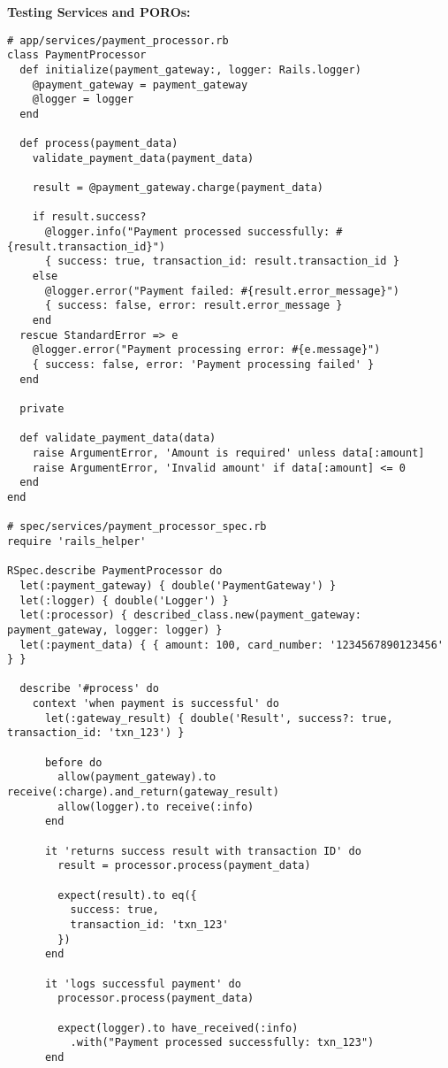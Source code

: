 \documentclass[12pt,a4paper]{article}
\begin{document}
\textbf{Testing Services and POROs:}
\begin{lstlisting}
# app/services/payment_processor.rb
class PaymentProcessor
  def initialize(payment_gateway:, logger: Rails.logger)
    @payment_gateway = payment_gateway
    @logger = logger
  end

  def process(payment_data)
    validate_payment_data(payment_data)
    
    result = @payment_gateway.charge(payment_data)
    
    if result.success?
      @logger.info("Payment processed successfully: #{result.transaction_id}")
      { success: true, transaction_id: result.transaction_id }
    else
      @logger.error("Payment failed: #{result.error_message}")
      { success: false, error: result.error_message }
    end
  rescue StandardError => e
    @logger.error("Payment processing error: #{e.message}")
    { success: false, error: 'Payment processing failed' }
  end

  private

  def validate_payment_data(data)
    raise ArgumentError, 'Amount is required' unless data[:amount]
    raise ArgumentError, 'Invalid amount' if data[:amount] <= 0
  end
end

# spec/services/payment_processor_spec.rb
require 'rails_helper'

RSpec.describe PaymentProcessor do
  let(:payment_gateway) { double('PaymentGateway') }
  let(:logger) { double('Logger') }
  let(:processor) { described_class.new(payment_gateway: payment_gateway, logger: logger) }
  let(:payment_data) { { amount: 100, card_number: '1234567890123456' } }

  describe '#process' do
    context 'when payment is successful' do
      let(:gateway_result) { double('Result', success?: true, transaction_id: 'txn_123') }

      before do
        allow(payment_gateway).to receive(:charge).and_return(gateway_result)
        allow(logger).to receive(:info)
      end

      it 'returns success result with transaction ID' do
        result = processor.process(payment_data)
        
        expect(result).to eq({
          success: true,
          transaction_id: 'txn_123'
        })
      end

      it 'logs successful payment' do
        processor.process(payment_data)
        
        expect(logger).to have_received(:info)
          .with("Payment processed successfully: txn_123")
      end


\end{lstlisting}
\end{document}
